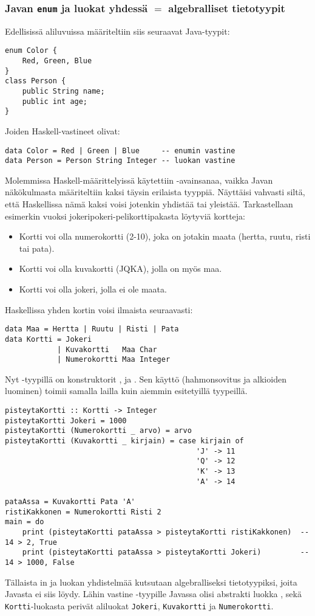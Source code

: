 \subsubsection{Javan \texttt{enum} ja luokat yhdessä $=$ algebralliset tietotyypit}
Edellisissä aliluvuissa määriteltiin siis seuraavat Java-tyypit:
\begin{verbatim}
enum Color {
    Red, Green, Blue
}
class Person {
    public String name;
    public int age;
}
\end{verbatim}
Joiden Haskell-vastineet olivat:
\begin{verbatim}
data Color = Red | Green | Blue     -- enumin vastine
data Person = Person String Integer -- luokan vastine
\end{verbatim}
Molemmissa Haskell-määrittelyissä käytettiin -avainsanaa,
vaikka Javan näkökulmasta määriteltiin kaksi täysin erilaista tyyppiä.
Näyttäisi vahvasti siltä, että Haskellissa nämä kaksi voisi jotenkin yhdistää tai yleistää.
Tarkastellaan esimerkin vuoksi jokeripokeri-pelikorttipakasta löytyviä kortteja:
\begin{itemize}
    \item Kortti voi olla numerokortti (2-10), joka on jotakin maata (hertta, ruutu, risti tai pata).
    \item Kortti voi olla kuvakortti (JQKA), jolla on myös maa.
    \item Kortti voi olla jokeri, jolla ei ole maata.
\end{itemize}
Haskellissa yhden kortin voisi ilmaista seuraavasti:
\begin{verbatim}
data Maa = Hertta | Ruutu | Risti | Pata
data Kortti = Jokeri
            | Kuvakortti   Maa Char
            | Numerokortti Maa Integer
\end{verbatim}
Nyt -tyypillä on konstruktorit ,  ja .
Sen käyttö (hahmonsovitus ja alkioiden luominen) toimii samalla lailla kuin aiemmin esitetyillä tyypeillä.
\begin{verbatim}
pisteytaKortti :: Kortti -> Integer
pisteytaKortti Jokeri = 1000
pisteytaKortti (Numerokortti _ arvo) = arvo
pisteytaKortti (Kuvakortti _ kirjain) = case kirjain of
                                            'J' -> 11
                                            'Q' -> 12
                                            'K' -> 13
                                            'A' -> 14

pataAssa = Kuvakortti Pata 'A'
ristiKakkonen = Numerokortti Risti 2
main = do
    print (pisteytaKortti pataAssa > pisteytaKortti ristiKakkonen)  -- 14 > 2, True
    print (pisteytaKortti pataAssa > pisteytaKortti Jokeri)         -- 14 > 1000, False
\end{verbatim}
Tällaista in ja luokan yhdistelmää kutsutaan algebralliseksi tietotyypiksi,
joita Javasta ei siis löydy.
Lähin vastine -tyypille Javassa olisi abstrakti luokka ,
sekä \texttt{Kortti}-luokasta perivät aliluokat \texttt{Jokeri}, \texttt{Kuvakortti} ja \texttt{Numerokortti}.

